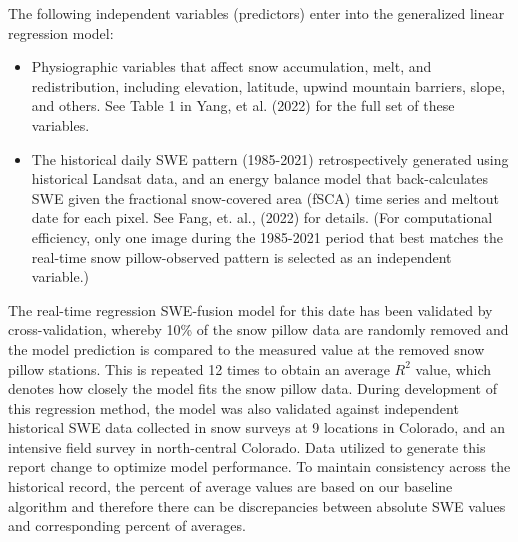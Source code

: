 \documentclass{article}
\begin{document}
\noindent The following independent variables (predictors) enter into the generalized linear regression model:
\begin{itemize}
    \item[-] Physiographic variables that affect snow accumulation, melt, and redistribution, including elevation, latitude, upwind mountain barriers, slope, and others. See Table 1 in Yang, et al. (2022) for the full set of these variables.
    \item[-] The historical daily SWE pattern (1985-2021) retrospectively generated using historical Landsat data, and an energy balance model that back-calculates SWE given the fractional snow-covered area (fSCA) time series and meltout date for each pixel. See Fang, et. al., (2022) for details. (For computational efficiency, only one image during the 1985-2021 period that best matches the real-time snow pillow-observed pattern is selected as an independent variable.)
\end{itemize}

\noindent The real-time regression SWE-fusion model for this date has been validated by cross-validation, whereby 10\% of the snow pillow data are randomly removed and the model prediction is compared to the measured value at the removed snow pillow stations. This is repeated 12 times to obtain an average $R^2$ value, which denotes how closely the model fits the snow pillow data. During development of this regression method, the model was also validated against independent historical SWE data collected in snow surveys at 9 locations in Colorado, and an intensive field survey in north-central Colorado. Data utilized to generate this report change to optimize model performance. To maintain consistency across the historical record, the percent of average values are based on our baseline algorithm and therefore there can be discrepancies between absolute SWE values and corresponding percent of averages.\\
\end{document}
